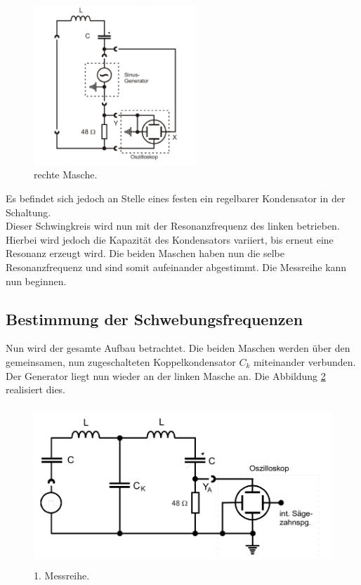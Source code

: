 \begin{figure}[H]
  \centering
  \includegraphics[height=6cm]{just2.png}
  \caption{rechte Masche.}
  \label{fig:3}
\end{figure}

Es befindet sich jedoch an Stelle eines festen ein regelbarer Kondensator in der Schaltung.\\
Dieser Schwingkreis wird nun mit der Resonanzfrequenz des linken betrieben.
Hierbei wird jedoch die Kapazität des Kondensators variiert, bis erneut eine Resonanz erzeugt wird.
Die beiden Maschen haben nun die selbe Resonanzfrequenz und sind somit aufeinander abgestimmt.
Die Messreihe kann nun beginnen.\\
\subsection{Bestimmung der Schwebungsfrequenzen}
\label{sec:d1}
Nun wird der gesamte Aufbau betrachtet.
Die beiden Maschen werden über den gemeinsamen, nun zugeschalteten Koppelkondensator $C_k$ miteinander verbunden.
Der Generator liegt nun wieder an der linken Masche an.
Die Abbildung \ref{fig:4} realisiert dies.

\begin{figure}[H]
  \centering
  \includegraphics[height=6cm]{a.png}
  \caption{1. Messreihe. \cite{sample}}
  \label{fig:4}
\end{figure}

